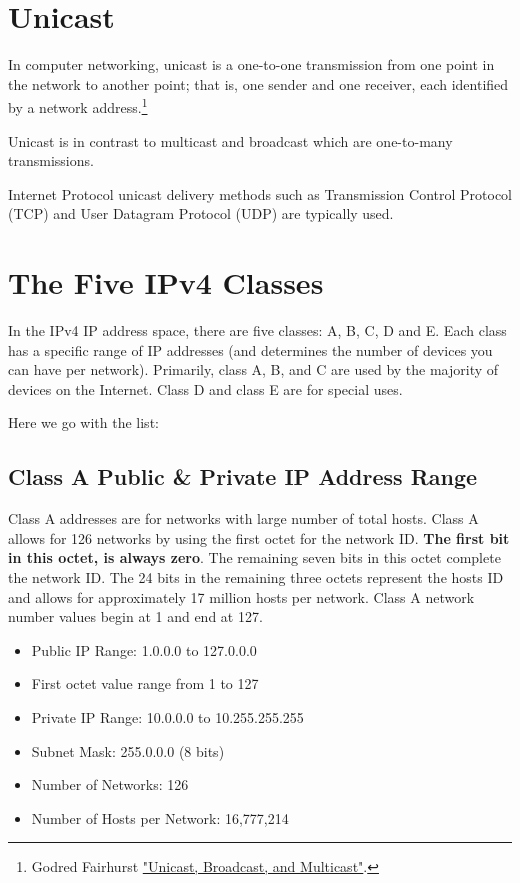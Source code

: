 \documentclass[a4paper,12pt]{book}
\begin{document}
\section{Unicast}
In computer networking, unicast is a one-to-one transmission from one point in the network to another point; that is, one sender and one receiver, each identified by a network address.\footnote{\label{unicast}Godred Fairhurst \href{https://www.erg.abdn.ac.uk/users/gorry/course/intro-pages/uni-b-mcast.html}{"Unicast, Broadcast, and Multicast"}.}

Unicast is in contrast to multicast and broadcast which are one-to-many transmissions.

Internet Protocol unicast delivery methods such as Transmission Control Protocol (TCP) and User Datagram Protocol (UDP) are typically used.

\section{The Five IPv4 Classes}
In the IPv4 IP address space, there are five classes: A, B, C, D and E. Each class has a specific range of IP addresses (and determines the number of devices you can have per network). Primarily, class A, B, and C are used by the majority of devices on the Internet. Class D and class E are for special uses.

\medskip
\noindent Here we go with the list:

\subsection{Class A Public & Private IP Address Range}
Class A addresses are for networks with large number of total hosts. Class A allows for 126 networks by using the first octet for the network ID. \textbf{The first bit in this octet, is always zero}. The remaining seven bits in this octet complete the network ID. The 24 bits in the remaining three octets represent the hosts ID and allows for approximately 17 million hosts per network. Class A network number values begin at 1 and end at 127.

\begin{itemize}
\item{Public IP Range: 1.0.0.0 to 127.0.0.0}
\item{First octet value range from 1 to 127}
\item{Private IP Range: 10.0.0.0 to 10.255.255.255}
\item{Subnet Mask: 255.0.0.0 (8 bits)}
\item{Number of Networks: 126}
\item{Number of Hosts per Network: 16,777,214}
\end{itemize}
 \clearpage
\end{document}
